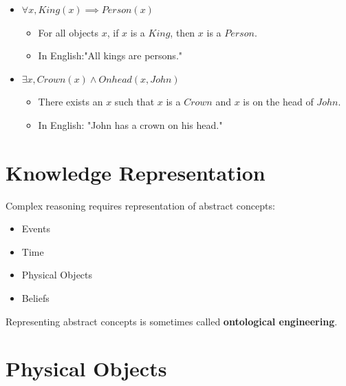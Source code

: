 \documentclass[11pt]{article}
\begin{document}
\begin{itemize}
\item \(\forall x, King(x) \implies Person(x)\)

\begin{itemize}
\item For all objects \(x\), if \(x\) is a \(King\), then \(x\) is a \(Person\).
\item In English:"All kings are persons."
\end{itemize}
\item \(\exists x, Crown(x) \land Onhead(x, John)\)

\begin{itemize}
\item There exists an \(x\) such that \(x\) is a \(Crown\) and \(x\) is on the head of \(John\).
\item In English: "John has a crown on his head."
\end{itemize}
\end{itemize}
\section{Knowledge Representation}
\label{sec:org33766a1}

Complex reasoning requires representation of abstract concepts:

\begin{itemize}
\item Events
\item Time
\item Physical Objects
\item Beliefs
\end{itemize}

Representing abstract concepts is sometimes called \textbf{ontological engineering}.
\section{Physical Objects}
\label{sec:orgd4c720e}
\end{document}
